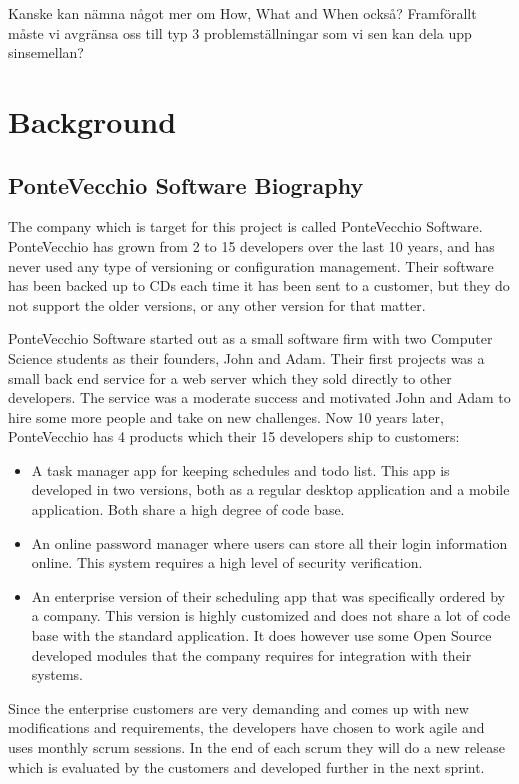 \documentclass[10pt]{article}
\begin{document}
\noindent Kanske kan nämna något mer om How, What and When också? Framförallt måste vi avgränsa oss till typ 3 problemställningar som vi sen kan dela upp sinsemellan?

\section{Background}
\subsection{PonteVecchio Software Biography}
The company which is target for this project is called PonteVecchio Software. PonteVecchio has grown from 2 to 15 developers over the last 10 years, and has never used any type of versioning or configuration management. Their software has been backed up to CDs each time it has been sent to a customer, but they do not support the older versions, or any other version for that matter.

\noindent PonteVecchio Software started out as a small software firm with two Computer Science students as their founders, John and Adam. Their first projects was a small back end service for a web server which they sold directly to other developers. The service was a moderate success and motivated John and Adam to hire some more people and take on new challenges. Now 10 years later, PonteVecchio has 4 products which their 15 developers ship to customers:
\begin{itemize}
\item A task manager app for keeping schedules and todo list. This app is developed in two versions, both as a regular desktop application and a mobile application. Both share a high degree of code base. 
\item An online password manager where users can store all their login information online. This system requires a high level of security verification.
\item An enterprise version of their scheduling app that was specifically ordered by a company. This version is highly customized and does not share a lot of code base with the standard application. It does however use some Open Source developed modules that the company requires for integration with their systems. 
\end{itemize}

\noindent Since the enterprise customers are very demanding and comes up with new modifications and requirements, the developers have chosen to work agile and uses monthly scrum sessions. In the end of each scrum they will do a new release which is evaluated by the customers and developed further in the next sprint.
\end{document}
